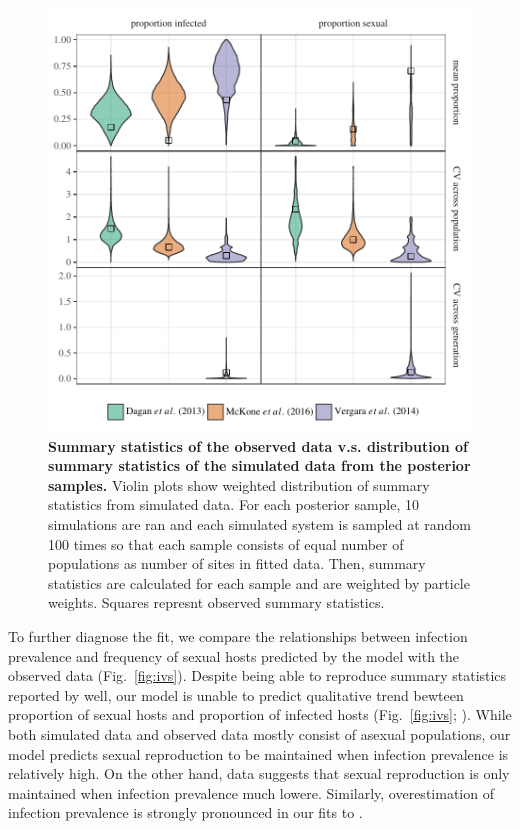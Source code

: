\documentclass{article}\usepackage[]{graphicx}\usepackage[]{color}
\newcommand{\fref}[1]{Fig.~\ref{fig:#1}}
\begin{document}
\begin{figure}[!ht]
\includegraphics[width=\textwidth]{../fig/smc_summary.pdf}
\caption{{\bf Summary statistics of the observed data v.s. distribution of summary statistics of the simulated data from the posterior samples.}
Violin plots show weighted distribution of summary statistics from simulated data. For each posterior sample, 10 simulations are ran and each simulated system is sampled at random 100 times so that each sample consists of equal number of populations as number of sites in fitted data. Then, summary statistics are calculated for each sample and are weighted by particle weights. Squares represnt observed summary statistics.
}
\label{fig:smcsumm}
\end{figure}

To further diagnose the fit, we compare the relationships between infection prevalence and frequency of sexual hosts predicted by the model with the observed data (\fref{ivs}).
Despite being able to reproduce summary statistics reported by \cite{dagan2013clonal} well, 
our model is unable to predict qualitative trend bewteen proportion of sexual hosts and proportion of infected hosts (\fref{ivs}; \cite{dagan2013clonal}).
While both simulated data and observed data mostly consist of asexual populations,
our model predicts sexual reproduction to be maintained when infection prevalence is relatively high. 
On the other hand, \cite{dagan2013clonal} data suggests that sexual reproduction is only maintained when infection prevalence much lowere.
Similarly, overestimation of infection prevalence is strongly pronounced in our fits to \cite{mckone2016fine}.
\end{document}
